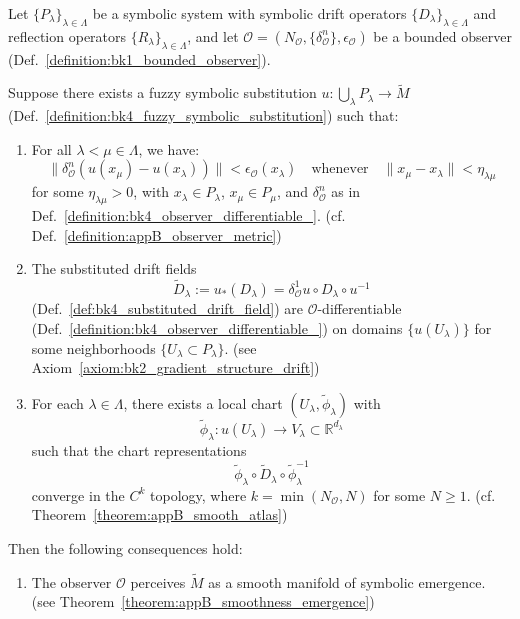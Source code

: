 \begin{theorem}
\label{thm:bk4_fuzzy_symbolic_geometry_theorem}

Let $\{P_\lambda\}_{\lambda \in \Lambda}$ be a symbolic system with symbolic drift operators $\{D_\lambda\}_{\lambda \in \Lambda}$ and reflection operators $\{R_\lambda\}_{\lambda \in \Lambda}$, and let $\mathcal{O} = (N_\mathcal{O}, \{\delta^n_\mathcal{O}\}, \epsilon_\mathcal{O})$ be a bounded observer (Def.~\ref{definition:bk1_bounded_observer}).

Suppose there exists a fuzzy symbolic substitution $u : \bigcup_\lambda P_\lambda \to \tilde{M}$ (Def.~\ref{definition:bk4_fuzzy_symbolic_substitution}) such that:

\begin{enumerate}
    \item For all $\lambda < \mu \in \Lambda$, we have:
    \[
    \|\delta^n_\mathcal{O}(u(x_\mu) - u(x_\lambda))\| < \epsilon_\mathcal{O}(x_\lambda)
    \quad \text{whenever} \quad \|x_\mu - x_\lambda\| < \eta_{\lambda\mu}
    \]
    for some $\eta_{\lambda\mu} > 0$, with $x_\lambda \in P_\lambda$, $x_\mu \in P_\mu$, and $\delta^n_\mathcal{O}$ as in Def.~\ref{definition:bk4_observer_differentiable_}. 
    (cf. Def.~\ref{definition:appB_observer_metric})
    
    \item The substituted drift fields 
    \[
    \tilde{D}_\lambda := u_*(D_\lambda) = \delta^1_\mathcal{O}u \circ D_\lambda \circ u^{-1}
    \]
    (Def.~\ref{def:bk4_substituted_drift_field}) 
    are $\mathcal{O}$-differentiable (Def.~\ref{definition:bk4_observer_differentiable_}) on domains $\{u(U_\lambda)\}$ for some neighborhoods $\{U_\lambda \subset P_\lambda\}$.
    (see Axiom~\ref{axiom:bk2_gradient_structure_drift})
    
    \item For each $\lambda \in \Lambda$, there exists a local chart $(U_\lambda, \tilde{\phi}_\lambda)$ with 
    \[
    \tilde{\phi}_\lambda: u(U_\lambda) \to V_\lambda \subset \mathbb{R}^{d_\lambda}
    \]
    such that the chart representations 
    \[
    \tilde{\phi}_\lambda \circ \tilde{D}_\lambda \circ \tilde{\phi}_\lambda^{-1}
    \]
    converge in the $C^k$ topology, where $k = \min(N_\mathcal{O}, N)$ for some $N \geq 1$.
    (cf. Theorem~\ref{theorem:appB_smooth_atlas})
\end{enumerate}

Then the following consequences hold:

\begin{enumerate}
    \item The observer $\mathcal{O}$ perceives $\tilde{M}$ as a smooth manifold of symbolic emergence.\\
    (see Theorem~\ref{theorem:appB_smoothness_emergence})


\end{enumerate}
\end{theorem}
